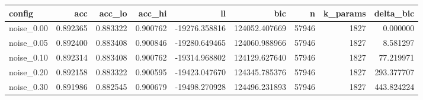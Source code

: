 \begin{tabular}{lrrrrrrrr}
\toprule
config & acc & acc\_lo & acc\_hi & ll & bic & n & k\_params & delta\_bic \\
\midrule
noise\_0.00 & 0.892365 & 0.883322 & 0.900762 & -19276.358816 & 124052.407669 & 57946 & 1827 & 0.000000 \\
noise\_0.05 & 0.892400 & 0.883408 & 0.900846 & -19280.649465 & 124060.988966 & 57946 & 1827 & 8.581297 \\
noise\_0.10 & 0.892314 & 0.883408 & 0.900762 & -19314.968802 & 124129.627640 & 57946 & 1827 & 77.219971 \\
noise\_0.20 & 0.892158 & 0.883322 & 0.900595 & -19423.047670 & 124345.785376 & 57946 & 1827 & 293.377707 \\
noise\_0.30 & 0.891986 & 0.882545 & 0.900679 & -19498.270928 & 124496.231893 & 57946 & 1827 & 443.824224 \\
\bottomrule
\end{tabular}
